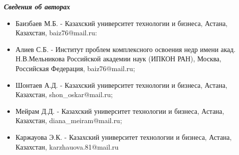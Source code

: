 \begin{center}
\emph{{\bfseries Сведения об авторах}}
\end{center}

\begin{itemize}
\item
Баизбаев М.Б. - Казахский университет технологии и бизнеса, Астана,
Казахстан, baiz76@mail.ru:

\item
Алиев С.Б. - Институт проблем комплексного освоения недр имени акад.
Н.В.Мельникова Российской академии наук (ИПКОН РАН), Москва, Российская
Федерация, baiz76@mail.ru;

\item
Шонтаев А.Д. - Казахский университет технологии и бизнеса, Астана,
Казахстан,
shon\_oskar@mail.ru;

\item
Мейрам Д.Д. - Казахский университет технологии и бизнеса, Астана,
Казахстан,
diana\_meiram@mail.ru;

\item
Каржауова Э.К. - Казахский университет технологии и бизнеса, Астана,
Казахстан,
karzhauova.81@mail.ru
\end{itemize}
